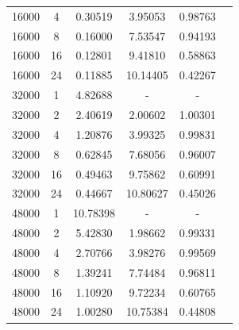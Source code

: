 \documentclass{article}
\begin{document}
\begin{table}[htbp]
\begin{tabular}{cccccc}
    16000 & 4     & 0.30519 & 3.95053 & 0.98763 \\
    16000 & 8     & 0.16000 & 7.53547 & 0.94193 \\
    16000 & 16    & 0.12801 & 9.41810 & 0.58863 \\
    16000 & 24    & 0.11885 & 10.14405 & 0.42267 \\
        \midrule
    32000 & 1     & 4.82688 & - & - \\
    32000 & 2     & 2.40619 & 2.00602 & 1.00301 \\
    32000 & 4     & 1.20876 & 3.99325 & 0.99831 \\
    32000 & 8     & 0.62845 & 7.68056 & 0.96007 \\
    32000 & 16    & 0.49463 & 9.75862 & 0.60991 \\
    32000 & 24    & 0.44667 & 10.80627 & 0.45026 \\
        \midrule
    48000 & 1     & 10.78398 & - & - \\
    48000 & 2     & 5.42830 & 1.98662 & 0.99331 \\
    48000 & 4     & 2.70766 & 3.98276 & 0.99569 \\
    48000 & 8     & 1.39241 & 7.74484 & 0.96811 \\
    48000 & 16    & 1.10920 & 9.72234 & 0.60765 \\
    48000 & 24    & 1.00280 & 10.75384 & 0.44808 \\
    \bottomrule
    \end{tabular}
  \label{tab:data}
\end{table}
\end{document}

